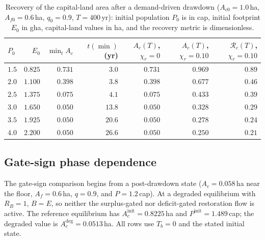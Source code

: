 \documentclass[11pt,a4paper]{article}
\begin{document}
\begin{table}[htbp]
\centering\small
\caption{Recovery of the capital-land area after a demand-driven drawdown ($A_{c0}=1.0$\,ha, $A_{f0}=0.6$\,ha, $q_0=0.9$, $T=400$\,yr): initial population $P_0$ is in cap, initial footprint $E_0$ in gha, capital-land values in ha, and the recovery metric is dimensionless.}
\label{tab:si_recovery}
\begin{tabular}{l r r r r r r}
\toprule
$P_0$ & $E_0$ & $\min_tA_c$ & $t(\min)$ (yr) & $A_c(T)$, $\chi_r=0$ & $A_c(T)$, $\chi_r=0.10$ & $\mathcal R_c(T)$, $\chi_r=0.10$ \\
\midrule
$1.5$ & $0.825$ & $0.731$ & $3.0$ & $0.731$ & $0.969$ & $0.89$ \\
$2.0$ & $1.100$ & $0.398$ & $3.8$ & $0.398$ & $0.677$ & $0.46$ \\
$2.5$ & $1.375$ & $0.075$ & $4.1$ & $0.075$ & $0.433$ & $0.39$ \\
$3.0$ & $1.650$ & $0.050$ & $13.8$ & $0.050$ & $0.328$ & $0.29$ \\
$3.5$ & $1.925$ & $0.050$ & $20.6$ & $0.050$ & $0.278$ & $0.24$ \\
$4.0$ & $2.200$ & $0.050$ & $26.6$ & $0.050$ & $0.250$ & $0.21$ \\
\bottomrule
\end{tabular}
\end{table}

\subsection{Gate-sign phase dependence}\label{si:gates}

The gate-sign comparison begins from a post-drawdown state ($A_c=0.058$\,ha near the floor, $A_f=0.6$\,ha, $q=0.9$, and $P=1.2$\,cap). At a degraded equilibrium with $R_B=1$, $B=E$, so neither the surplus-gated nor deficit-gated restoration flow is active. The reference equilibrium has $A_c^{\mathrm{init}}=0.8225$\,ha and $P^{\mathrm{init}}=1.489$\,cap; the degraded value is $A_c^{\mathrm{deg}}=0.0513$\,ha. All rows use $T_b=0$ and the stated initial state.
\end{document}
